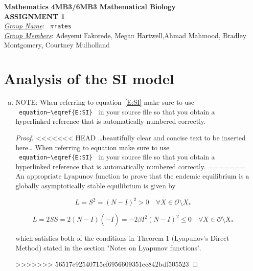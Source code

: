 \documentclass[12pt]{article}
\begin{document}
\begin{center}
{\bfseries Mathematics 4MB3/6MB3 Mathematical Biology\\
 ASSIGNMENT {\color{blue}1}}\\
\medskip
\underline{\emph{Group Name}}: \texttt{{\color{blue} $\pi$rates}}\\
\medskip
\underline{\emph{Group Members}}: {\color{blue}Adeyemi Fakorede, Megan Hartwell,Ahmad Mahmood, Bradley Montgomery, Courtney Mulholland}
\end{center}

\section{Analysis of the SI model}

\SIanalIntro
\begin{enumerate}[(a)]
\item \SIanalQa
  
  {\color{blue}
  
  		NOTE: When referring to equation~\eqref{E:SI} make sure to use ~\verb|equation~\eqref{E:SI}|~ in your source file so that you obtain a hyperlinked reference that is automatically numbered correctly.
  
    \begin{proof}
<<<<<<< HEAD
      {\color{magenta}\dots beautifully clear and concise text to be inserted here\dots}
      When referring to equation make sure to use ~\verb|equation~\eqref{E:SI}|~ in your source file so that you obtain a hyperlinked reference that is automatically numbered correctly.
=======
	      An appropriate Lyapunov function to prove that the endemic equilibrium is a globally asymptotically stable equilibrium is given by 
	      
	      \begin{equation}
	      	L=S^2=(N-I)^2 > 0 \quad \forall X\in\mathcal{O}\setminus{X_*}
	      \end{equation}
	      
	       \begin{equation}
	      	\dot{L}=2S\dot{S}=2(N-I)(-\dot{I})=-2\beta I^2 (N-I)^2 \leq 0 \quad \forall X\in\mathcal{O}\setminus{X_*}
	      \end{equation}
	      
	      which satisfies both of the conditions in Theorem 1 (Lyapunov's Direct Method) stated in the section "Notes on Lyapunov functions".

>>>>>>> 56517c92540715ef6956609351ec842bdf505523
    \end{proof}
  }
  

\end{enumerate}
\end{document}

